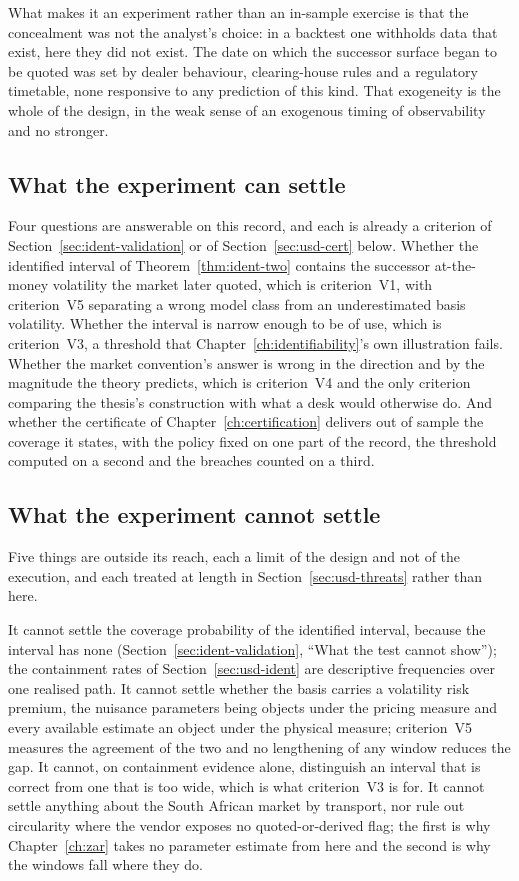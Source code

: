 \documentclass[../../../main.tex]{subfiles}
\begin{document}
What makes it an experiment rather than an in-sample exercise is that the concealment was not the analyst's choice: in a backtest one withholds data that exist, here they did not exist. The date on which the successor surface began to be quoted was set by dealer behaviour, clearing-house rules and a regulatory timetable, none responsive to any prediction of this kind. That exogeneity is the whole of the design, in the weak sense of an exogenous timing of observability and no stronger.

\subsection{What the experiment can settle}

Four questions are answerable on this record, and each is already a criterion of Section~\ref{sec:ident-validation} or of Section~\ref{sec:usd-cert} below. Whether the identified interval of Theorem~\ref{thm:ident-two} contains the successor at-the-money volatility the market later quoted, which is criterion~V1, with criterion~V5 separating a wrong model class from an underestimated basis volatility. Whether the interval is narrow enough to be of use, which is criterion~V3, a threshold that Chapter~\ref{ch:identifiability}'s own illustration fails. Whether the market convention's answer is wrong in the direction and by the magnitude the theory predicts, which is criterion~V4 and the only criterion comparing the thesis's construction with what a desk would otherwise do. And whether the certificate of Chapter~\ref{ch:certification} delivers out of sample the coverage it states, with the policy fixed on one part of the record, the threshold computed on a second and the breaches counted on a third.

\subsection{What the experiment cannot settle}

Five things are outside its reach, each a limit of the design and not of the execution, and each treated at length in Section~\ref{sec:usd-threats} rather than here.

It cannot settle the coverage probability of the identified interval, because the interval has none (Section~\ref{sec:ident-validation}, ``What the test cannot show''); the containment rates of Section~\ref{sec:usd-ident} are descriptive frequencies over one realised path. It cannot settle whether the basis carries a volatility risk premium, the nuisance parameters being objects under the pricing measure and every available estimate an object under the physical measure; criterion~V5 measures the agreement of the two and no lengthening of any window reduces the gap. It cannot, on containment evidence alone, distinguish an interval that is correct from one that is too wide, which is what criterion~V3 is for. It cannot settle anything about the South African market by transport, nor rule out circularity where the vendor exposes no quoted-or-derived flag; the first is why Chapter~\ref{ch:zar} takes no parameter estimate from here and the second is why the windows fall where they do.
\end{document}
